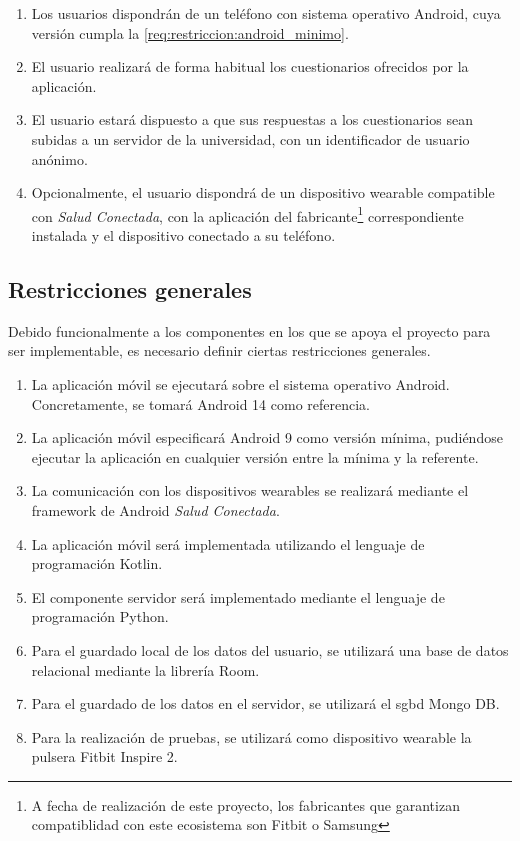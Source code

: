         \begin{enumerate}
            \item Los usuarios dispondrán de un teléfono con sistema operativo Android, cuya versión cumpla la \ref{req:restriccion:android_minimo}.
            \item El usuario realizará de forma habitual los cuestionarios ofrecidos por la aplicación.
            \item El usuario estará dispuesto a que sus respuestas a los cuestionarios sean subidas a un servidor de la universidad, con un identificador de usuario anónimo.
            \item Opcionalmente, el usuario dispondrá de un dispositivo \gls{wearable} compatible con \textit{Salud Conectada}, con la aplicación del fabricante\footnote{A fecha de realización de este proyecto, los fabricantes que garantizan compatiblidad con este ecosistema son Fitbit o Samsung} correspondiente instalada y el dispositivo conectado a su teléfono.
            
        \end{enumerate}
        
    \subsection{Restricciones generales}
        \label{req:descripcion:restricciones}
        Debido funcionalmente a los componentes en los que se apoya el proyecto para ser implementable, es necesario definir ciertas restricciones generales.

        
        \begin{enumerate}[label=\textbf{RG-\arabic*}]
            \item \label{req:restriccion:android_referencia} La aplicación móvil se ejecutará sobre el sistema operativo Android. Concretamente, se tomará Android 14 como referencia.
            \item \label{req:restriccion:android_minimo} La aplicación móvil especificará Android 9 como versión mínima, pudiéndose ejecutar la aplicación en cualquier versión entre la mínima y la referente.
            \item La comunicación con los dispositivos \glspl{wearable} se realizará mediante el \gls{framework} de Android \textit{Salud Conectada}.
            \item La aplicación móvil será implementada utilizando el lenguaje de programación Kotlin.
            \item El componente servidor será implementado mediante el lenguaje de programación Python.
            \item Para el guardado local de los datos del usuario, se utilizará una base de datos relacional mediante la librería Room.
            \item Para el guardado de los datos en el servidor, se utilizará el \gls{sgbd} Mongo DB.
            \item Para la realización de pruebas, se utilizará como dispositivo \gls{wearable} la pulsera Fitbit Inspire 2.
        \end{enumerate}
    
